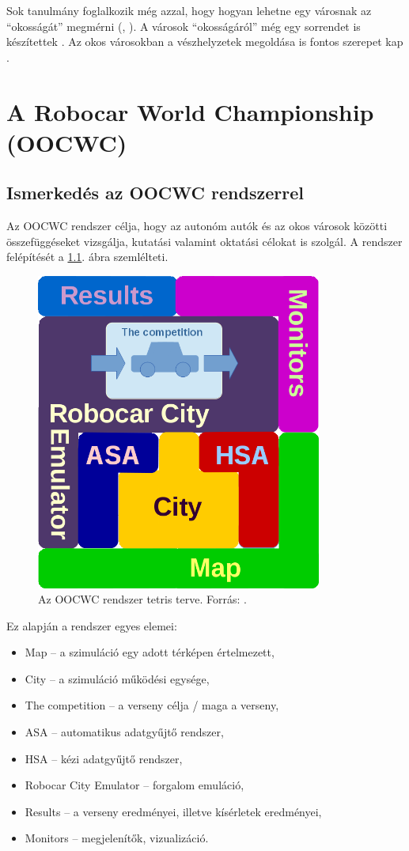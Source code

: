 \documentclass[a4paper,12pt]{report}
\begin{document}
\vspace{2mm}
Sok tanulmány foglalkozik még azzal, hogy hogyan lehetne egy városnak az ``okosságát'' megmérni (\cite{de2014smart}, \cite{carli2013measuring}). A városok ``okosságáról'' még egy sorrendet is készítettek \cite{giffinger2007smart}. Az okos városokban a vészhelyzetek megoldása is fontos szerepet kap \cite{du2012research}.

\chapter{A Robocar World Championship (OOCWC)}
\label{oocwc}

\section{Ismerkedés az OOCWC rendszerrel}

Az OOCWC rendszer célja, hogy az autonóm autók és az okos városok közötti összefüggéseket vizsgálja, kutatási valamint oktatási célokat is szolgál. A rendszer felépítését a \ref{basedesign}. ábra szemlélteti.

\begin{figure}[h]
\centerline{
\includegraphics[width=3.7in]{img/tetris_plan}}
\caption{Az OOCWC rendszer tetris terve. Forrás: \cite{oocwcrepo}.}
\label{basedesign}
\end{figure}

Ez alapján a rendszer egyes elemei:

\begin{itemize}
\item Map -- a szimuláció egy adott térképen értelmezett,
\item City -- a szimuláció működési egysége,
\item The competition -- a verseny célja / maga a verseny,
\item ASA -- automatikus adatgyűjtő rendszer,
\item HSA -- kézi adatgyűjtő rendszer,
\item Robocar City Emulator -- forgalom emuláció,
\item Results -- a verseny eredményei, illetve kísérletek eredményei,
\item Monitors -- megjelenítők, vizualizáció.
\end{itemize}
\end{document}
